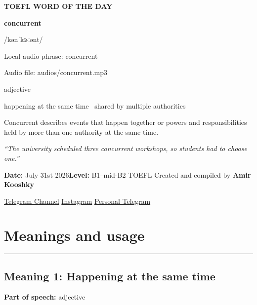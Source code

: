 \documentclass[11pt]{article}
\newcommand{\sectionrule}{\par\vspace{-0.5em}\noindent\textcolor{Accent}{\rule{\linewidth}{0.6pt}}\par}
\begin{document}
\begin{center}
{\sffamily\bfseries\color{Accent} TOEFL WORD OF THE DAY\par}
\vspace{8mm}
{\fontsize{42}{48}\selectfont\bfseries concurrent\par}
\vspace{2mm}
{\Large\sffamily\color{Accent} /kənˈkɝːənt/\par}
\vspace{2mm}
{\small\sffamily Local audio phrase: concurrent\par}
{\small\sffamily Audio file: audios/concurrent.mp3\par}
\vspace{2mm}
{\large\sffamily\color{Muted} adjective\par}
\vspace{5mm}
{\sffamily happening at the same time \textbullet\ shared by multiple authorities\par}
\vspace{6mm}
{\large Concurrent describes events that happen together or powers and responsibilities held by more than one authority at the same time.\par}
\vspace{6mm}
\begin{minipage}{0.84\textwidth}
\itshape “The university scheduled three concurrent workshops, so students had to choose one.”
\end{minipage}\par
\vspace{10mm}
\textbf{Date:} July 31st 2026\quad\textbullet\quad \textbf{Level:} B1--mid-B2 TOEFL
\vfill
Created and compiled by \textbf{Amir Kooshky}\par
\vspace{2mm}
\href{https://t.me/KooshkyTOEFL}{Telegram Channel}\quad\textbullet\quad
\href{https://www.instagram.com/kooshkytoefl}{Instagram}\quad\textbullet\quad
\href{https://t.me/KooshkyTOEFL\_pv}{Personal Telegram}
\end{center}
\newpage
\tableofcontents
\newpage

\section{Meanings and usage}
\sectionrule
\subsection{Meaning 1: Happening at the same time}
\textbf{Part of speech:} adjective
\end{document}
